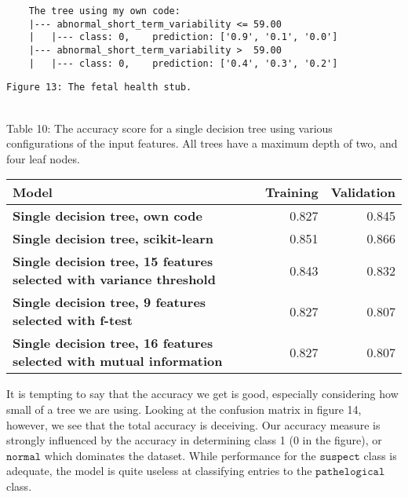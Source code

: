 \documentclass[11pt]{article}
\begin{document}
\begin{BVerbatim}
	The tree using my own code:
	|--- abnormal_short_term_variability <= 59.00
	|   |--- class: 0,    prediction: ['0.9', '0.1', '0.0']
	|--- abnormal_short_term_variability >  59.00
	|   |--- class: 0,    prediction: ['0.4', '0.3', '0.2']
\end{BVerbatim}

 \begin{Verbatim}[commandchars=\\\{\}]
	Figure 13: The fetal health stub.
\end{Verbatim}
 
{ \hspace*{\fill} \\}
Table 10: The accuracy score for a single decision tree using various configurations of the input features. All trees have a maximum depth of two, and four leaf nodes.
\begin{table}[h!]
	\begin{center}
		\label{tab:table1}
		\begin{tabular}{l|r|r}
			\textbf{Model}                                                      		   & \textbf{Training} & \textbf{Validation}
			\\ \hline
			\textbf{Single decision tree, own code}                                        & 0.827         & 0.845               \\ \hline
			\textbf{Single decision tree, scikit-learn}                                    & 0.851         & 0.866               \\ \hline
			\textbf{Single decision tree, 15 features selected with variance threshold}    & 0.843         & 0.832               \\ \hline
			\textbf{Single decision tree, 9 features selected with f-test}                 & 0.827         & 0.807               \\ \hline
			\textbf{Single decision tree, 16 features selected with mutual information}    & 0.827         & 0.807               \\ \hline
		\end{tabular}
	\end{center}
\end{table}

It is tempting to say that the accuracy we get is good, especially considering how small of a tree we are using. Looking at the confusion matrix in figure 14, however, we see that the total accuracy is deceiving. Our accuracy measure is strongly influenced by the accuracy in determining class 1 (0 in the figure), or $\texttt{normal}$ which dominates the dataset. While performance for the $\texttt{suspect}$ class is adequate, the model is quite useless at classifying entries to the $\texttt{pathelogical}$ class. 
 
\end{document}
